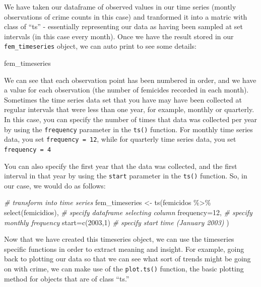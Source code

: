 \documentclass[
]{book}
\makeatletter
\newenvironment{Shaded}{\begin{snugshade}}{\end{snugshade}}
\newcommand{\AttributeTok}[1]{\textcolor[rgb]{0.61,0.61,0.61}{#1}}
\newcommand{\CommentTok}[1]{\textcolor[rgb]{0.37,0.37,0.37}{\textit{#1}}}
\newcommand{\DecValTok}[1]{\textcolor[rgb]{0.06,0.06,0.06}{#1}}
\newcommand{\FunctionTok}[1]{\textcolor[rgb]{0,0,0}{#1}}
\newcommand{\NormalTok}[1]{#1}
\newcommand{\OtherTok}[1]{\textcolor[rgb]{0.37,0.37,0.37}{#1}}
\newcommand{\SpecialCharTok}[1]{\textcolor[rgb]{0,0,0}{#1}}
\newenvironment{kframe}{%
\medskip{}
\setlength{\fboxsep}{.8em}
 \def\at@end@of@kframe{}%
 \ifinner\ifhmode%
  \def\at@end@of@kframe{\end{minipage}}%
  \begin{minipage}{\columnwidth}%
 \fi\fi%
 \def\FrameCommand##1{\hskip\@totalleftmargin \hskip-\fboxsep
 \colorbox{shadecolor}{##1}\hskip-\fboxsep
     \hskip-\linewidth \hskip-\@totalleftmargin \hskip\columnwidth}%
 \MakeFramed {\advance\hsize-\width
   \@totalleftmargin\z@ \linewidth\hsize
   \@setminipage}}%
 {\par\unskip\endMakeFramed%
 \at@end@of@kframe}
\renewenvironment{Shaded}{\begin{kframe}}{\end{kframe}}
\makeatother
\begin{document}
We have taken our dataframe of observed values in our time series (montly observations of crime counts in this case) and tranformed it into a matric with class of ``ts'' - essentially representing our data as having been sampled at set intervals (in this case every month). Once we have the result stored in our \texttt{fem\_timeseries} object, we can auto print to see some details:

\begin{Shaded}
\begin{Highlighting}[]
\NormalTok{fem\_timeseries}
\end{Highlighting}
\end{Shaded}

We can see that each observation point has been numbered in order, and we have a value for each observation (the number of femicides recorded in each month). Sometimes the time series data set that you have may have been collected at regular intervals that were less than one year, for example, monthly or quarterly. In this case, you can specify the number of times that data was collected per year by using the \texttt{frequency} parameter in the \texttt{ts()} function. For monthly time series data, you set \texttt{frequency\ =\ 12}, while for quarterly time series data, you set \texttt{frequency\ =\ 4}

You can also specify the first year that the data was collected, and the first interval in that year by using the \texttt{start} parameter in the \texttt{ts()} function. So, in our case, we would do as follows:

\begin{Shaded}
\begin{Highlighting}[]
\CommentTok{\# transform into time series}
\NormalTok{fem\_timeseries }\OtherTok{\textless{}{-}} \FunctionTok{ts}\NormalTok{(femicidos }\SpecialCharTok{\%\textgreater{}\%} 
                       \FunctionTok{select}\NormalTok{(femicidios), }\CommentTok{\# specify dataframe selecting column}
                     \AttributeTok{frequency=}\DecValTok{12}\NormalTok{,  }\CommentTok{\# specify monthly frequency}
                     \AttributeTok{start=}\FunctionTok{c}\NormalTok{(}\DecValTok{2003}\NormalTok{,}\DecValTok{1}\NormalTok{) }\CommentTok{\# specify start time (January 2003)}
\NormalTok{                     )}
\end{Highlighting}
\end{Shaded}

Now that we have created this timeseries object, we can use the timeseries specific functions in order to extract meaning and insight. For example, going back to plotting our data so that we can see what sort of trends might be going on with crime, we can make use of the \texttt{plot.ts()} function, the basic plotting method for objects that are of class ``ts.''
\end{document}
